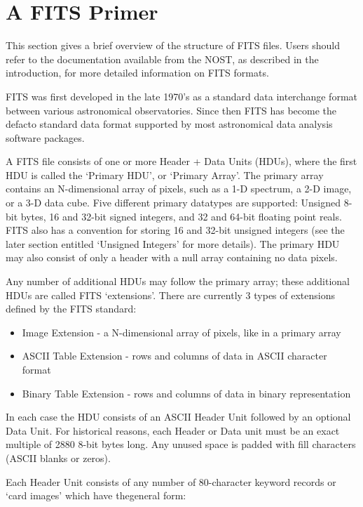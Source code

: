 \documentclass[11pt]{book}
\begin{document}
\chapter{  A FITS Primer }

This section gives a brief overview of the structure of FITS files.
Users should refer to the documentation available from the NOST, as
described in the introduction, for more detailed information on FITS
formats.

FITS was first developed in the late 1970's as a standard data
interchange format between various astronomical observatories.  Since
then FITS has become the defacto standard data format supported by most
astronomical data analysis software packages.

A FITS file consists of one or more Header + Data Units (HDUs), where
the first HDU is called the `Primary HDU', or `Primary Array'.  The
primary array contains an N-dimensional array of pixels, such as a 1-D
spectrum, a 2-D image, or a 3-D data cube.  Five different primary
datatypes are supported: Unsigned 8-bit bytes, 16 and 32-bit signed
integers, and 32 and 64-bit floating point reals.  FITS also has a
convention for storing 16 and 32-bit unsigned integers (see the later
section entitled `Unsigned Integers' for more details). The primary HDU
may also consist of only a header with a null array containing no
data pixels.

Any number of additional HDUs may follow the primary array; these
additional HDUs are called FITS `extensions'.  There are currently 3
types of extensions defined by the FITS standard:

\begin{itemize}
\item
  Image Extension - a N-dimensional array of pixels, like in a primary array
\item
  ASCII Table Extension - rows and columns of data in ASCII character format
\item
  Binary Table Extension - rows and columns of data in binary representation
\end{itemize}

In each case the HDU consists of an ASCII Header Unit followed by an optional
Data Unit.  For historical reasons, each Header or Data unit must be an
exact multiple of 2880 8-bit bytes long.  Any unused space is padded
with fill characters (ASCII blanks or zeros).

Each Header Unit consists of any number of 80-character keyword records
or `card images' which have thegeneral form:
\end{document}
